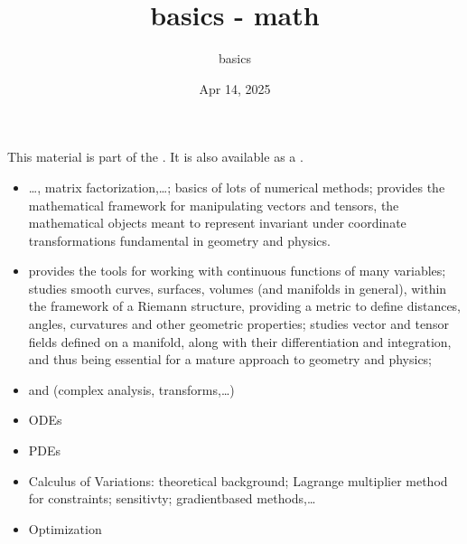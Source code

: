 \documentclass[letterpaper,10pt,english]{jupyterBook}
\title{basics - math}
\date{Apr 14, 2025}
\author{basics}
\begin{document}
\pagestyle{empty}
\sphinxmaketitle
\pagestyle{plain}
\sphinxtableofcontents
\pagestyle{normal}
\label{\detokenize{intro::doc}}


\sphinxAtStartPar
This material is part of the . It is also available as a .



\sphinxAtStartPar
{}
\begin{itemize}
\item {} 
\sphinxAtStartPar
{} …, matrix factorization,…; basics of lots of numerical methods;  provides the mathematical framework for manipulating vectors and tensors, the mathematical objects meant to represent  \sphinxhyphen{} invariant under coordinate transformations \sphinxhyphen{} fundamental in geometry and physics.

\item {} 
\sphinxAtStartPar
{} provides the tools for working with continuous functions of many variables;  studies smooth curves, surfaces, volumes (and manifolds in general), within the framework of a Riemann structure, providing a metric to define distances, angles, curvatures and other geometric properties;  studies vector and tensor fields defined on a manifold, along with their differentiation and integration, and thus being essential for a mature approach to geometry and physics;

\item {} 
\sphinxAtStartPar
{} and  (complex analysis, transforms,…)

\item {} 
\sphinxAtStartPar
ODEs

\item {} 
\sphinxAtStartPar
PDEs

\item {} 
\sphinxAtStartPar
Calculus of Variations: theoretical background; Lagrange multiplier method for constraints; sensitivty; gradient\sphinxhyphen{}based methods,…

\item {} 
\sphinxAtStartPar
Optimization

\end{itemize}
\end{document}
